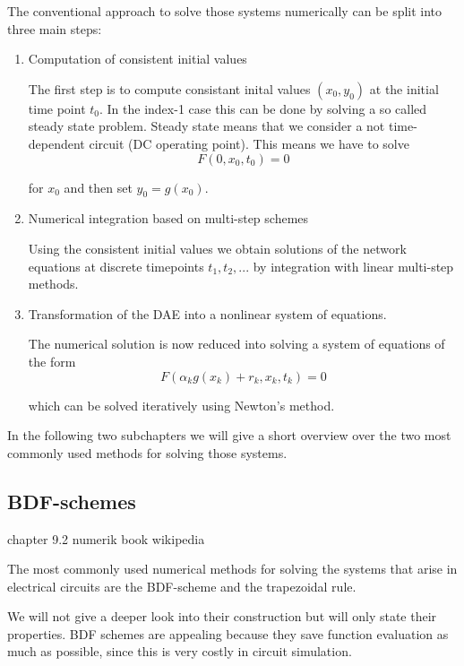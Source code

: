 The conventional approach to solve those systems numerically can be split into three main steps:
\begin{enumerate}
	\item Computation of consistent initial values
	
	The first step is to compute consistant inital values $(x_0, y_0)$ at the initial time point $t_0$. In the index-1 case this can be done by solving a so called steady state problem. Steady state means that we consider a not time-dependent circuit (DC operating point). This means we have to solve
	\begin{displaymath}
		F(0,x_0,t_0) = 0
	\end{displaymath}
	
	for $x_0$ and then set $y_0 = g(x_0)$.
	
	\item Numerical integration based on multi-step schemes
	
	Using the consistent initial values we obtain solutions of the network equations at discrete timepoints $t_1, t_2, ...$ by integration with linear multi-step methods.
	
	\item Transformation of the DAE into a nonlinear system of equations. 
	
	The numerical solution is now reduced into solving a system of equations of the form
	\begin{displaymath}
		F(\alpha_k g(x_k) + r_k, x_k, t_k) = 0
	\end{displaymath}
	
	which can be solved iteratively using Newton's method.
\end{enumerate}

In the following two subchapters we will give a short overview over the two most commonly used methods for solving those systems.

\subsection{BDF-schemes}
	chapter 9.2 numerik book
	wikipedia
	
	The most commonly used numerical methods for solving the systems that arise in electrical circuits are the BDF-scheme and the trapezoidal rule. 
	
	We will not give a deeper look into their construction but will only state their properties. BDF schemes are appealing because they save function evaluation as much as possible, since this is very costly in circuit simulation.
	

